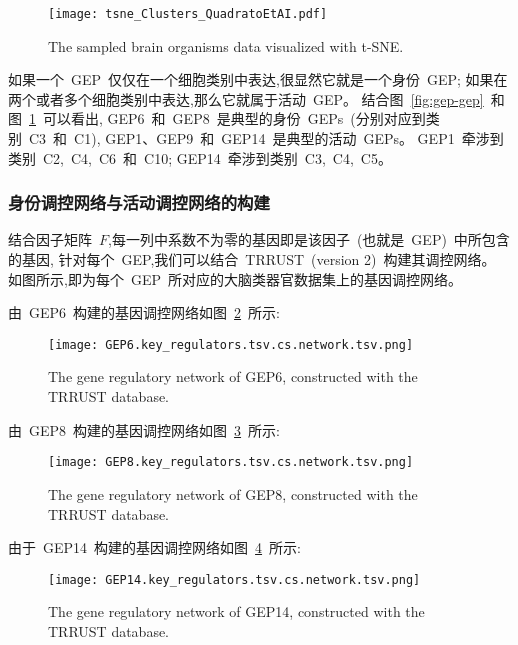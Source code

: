 \begin{figure}[!htbp]
    \centering
    \texttt{[image: tsne\_Clusters\_QuadratoEtAI.pdf]}
    \caption{The sampled brain organisms data visualized with t-SNE.
    }
    \label{fig:gep-tsne}
\end{figure}

如果一个~GEP~仅仅在一个细胞类别中表达,很显然它就是一个身份~GEP;
如果在两个或者多个细胞类别中表达,那么它就属于活动~GEP。
结合图~\ref{fig:gep-gep}~和图~\ref{fig:gep-tsne}~可以看出, 
GEP6~和~GEP8~是典型的身份~GEPs~(分别对应到类别~C3~和~C1), GEP1、GEP9~和~GEP14~是典型的活动~GEPs。
GEP1~牵涉到类别~C2,~C4,~C6~和~C10; GEP14~牵涉到类别~C3,~C4,~C5。

\subsubsection{身份调控网络与活动调控网络的构建}
结合因子矩阵~$F$,每一列中系数不为零的基因即是该因子~(也就是~GEP)~中所包含的基因,
针对每个~GEP,我们可以结合~TRRUST~(version 2)~构建其调控网络。
如图所示,即为每个~GEP~所对应的大脑类器官数据集上的基因调控网络。

由~GEP6~构建的基因调控网络如图~\ref{fig:gep-grn-gep6}~所示:
\begin{figure}[!htbp]
    \centering
    \texttt{[image: GEP6.key\_regulators.tsv.cs.network.tsv.png]}
    \caption{The gene regulatory network of GEP6, constructed with the TRRUST database.}
    \label{fig:gep-grn-gep6}
\end{figure}

由~GEP8~构建的基因调控网络如图~\ref{fig:gep-grn-gep8}~所示:
\begin{figure}[!htbp]
    \centering
    \texttt{[image: GEP8.key\_regulators.tsv.cs.network.tsv.png]}
    \caption{The gene regulatory network of GEP8, constructed with the TRRUST database.}
    \label{fig:gep-grn-gep8}
\end{figure}

由于~GEP14~构建的基因调控网络如图~\ref{fig:gep-grn-gep14}~所示:
\begin{figure}[!htbp]
    \centering
    \texttt{[image: GEP14.key\_regulators.tsv.cs.network.tsv.png]}
    \caption{The gene regulatory network of GEP14, constructed with the TRRUST database.}
    \label{fig:gep-grn-gep14}
\end{figure}

